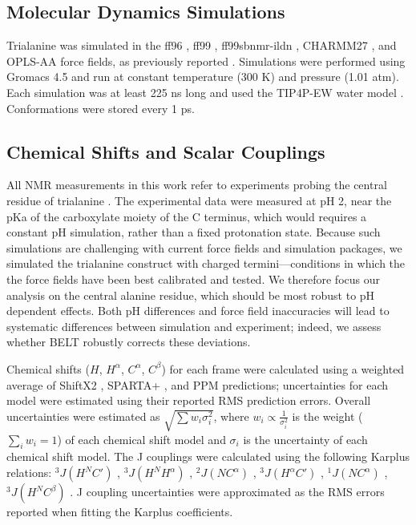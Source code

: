 \documentclass[12pt]{article}
\begin{document}
\subsection*{Molecular Dynamics Simulations}

Trialanine was simulated in the ff96 \cite{kollman1996}, ff99 \cite{wang2000}, ff99sbnmr-ildn \cite{li2010, Lindorff-Larsen2010}, CHARMM27 \cite{mackerell2004extending,bjelkmar2010implementation}, and OPLS-AA \cite{kaminski2001evaluation} force fields, as previously reported  \cite{beauchamp2012protein}.  Simulations were performed using Gromacs 4.5  \cite{hess2008} and run at constant temperature (300 K) and pressure (1.01 atm).  Each simulation was at least 225 ns long and used the TIP4P-EW water model \cite{horn2004}.  Conformations were stored every 1 ps.  

\subsection*{Chemical Shifts and Scalar Couplings}

All NMR measurements in this work refer to experiments probing the central residue of trialanine \cite{Graf2007}.  The experimental data were measured at pH 2, near the pKa of the carboxylate moiety of the C terminus, which would requires a constant pH simulation, rather than a fixed protonation state.  Because such simulations are challenging with current force fields and simulation packages, we simulated the trialanine construct with charged termini---conditions in which the the force fields have been best calibrated and tested.  We therefore focus our analysis on the central alanine residue, which should be most robust to pH dependent effects.  Both pH differences and force field inaccuracies will lead to systematic differences between simulation and experiment; indeed, we assess whether BELT robustly corrects these deviations.  

Chemical shifts ($H$, $H^\alpha$, $C^\alpha$, $C^\beta$) for each frame were calculated using a weighted average of ShiftX2 \cite{han2011shiftx2}, SPARTA+  \cite{Shen2010}, and PPM \cite{li2012ppm} predictions; uncertainties for each model were estimated using their reported RMS prediction errors.  Overall uncertainties were estimated as $\sqrt{\sum w_i \sigma_i^2}$, where $w_i \propto \frac{1}{\sigma_i^2}$ is the weight ($\sum_i w_i = 1$) of each chemical shift model and $\sigma_i$ is the uncertainty of each chemical shift model.  The J couplings were calculated using the following Karplus relations: $^3J(H^N C')$  \cite{vogeli2007limits}, $^3J(H^N H^\alpha)$  \cite{vogeli2007limits}, $^2J(N C^\alpha)$  \cite{Graf2007}, $^3J(H^\alpha C')$  \cite{Schmidt1999}, $^1J(N C^\alpha)$  \cite{Graf2007}, $^3J(H^N C^\beta)$  \cite{vogeli2007limits}.  J coupling uncertainties were approximated as the RMS errors reported when fitting the Karplus coefficients.  
\end{document}
